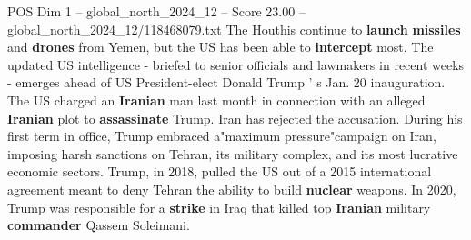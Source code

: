 \begin{textsample}{POS Dim 1 – global\_north\_2024\_12 – Score 23.00 – global\_north\_2024\_12/118468079.txt}
The Houthis continue to \textbf{launch} \textbf{missiles} and \textbf{drones} from Yemen, but the US has been able to \textbf{intercept} most.
The updated US intelligence - briefed to senior officials and lawmakers in recent weeks - emerges ahead of US President-elect Donald Trump ' s Jan. 20 inauguration.
The US charged an \textbf{Iranian} man last month in connection with an alleged \textbf{Iranian} plot to \textbf{assassinate} Trump.
Iran has rejected the accusation.
During his first term in office, Trump embraced a"maximum pressure"campaign on Iran, imposing harsh sanctions on Tehran, its military complex, and its most lucrative economic sectors.
Trump, in 2018, pulled the US out of a 2015 international agreement meant to deny Tehran the ability to build \textbf{nuclear} weapons.
In 2020, Trump was responsible for a \textbf{strike} in Iraq that killed top \textbf{Iranian} military \textbf{commander} Qassem Soleimani.

\end{textsample}
